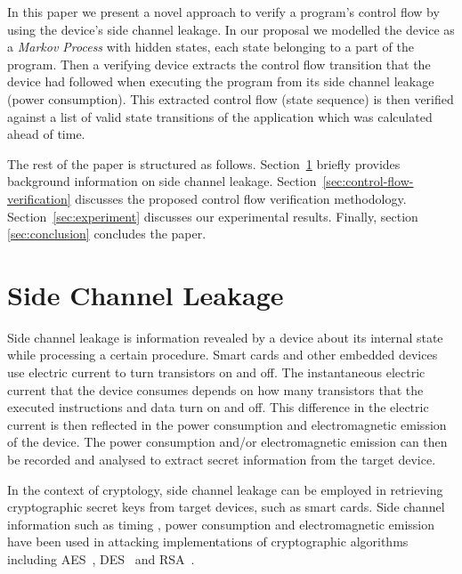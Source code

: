 \documentclass[lnicst]{svmultln}
\begin{document}
In this paper we present a novel approach to verify a program's control flow by using the device's side channel leakage. In our proposal we modelled the device as a \emph{Markov Process} with hidden states, each state belonging to a part of the program. Then a verifying device extracts the control flow transition that the device had followed when executing the program from its side channel leakage (power consumption). This extracted control flow (state sequence) is then verified against a list of valid state transitions of the application which was calculated ahead of time.

The rest of the paper is structured as follows. Section~\ref{sec:power-analysis} briefly provides background information on side channel leakage. Section~\ref{sec:control-flow-verification} discusses the proposed control flow verification methodology. Section~\ref{sec:experiment} discusses our experimental results. Finally, section \ref{sec:conclusion} concludes the paper.

\section{Side Channel Leakage}
\label{sec:power-analysis}

Side channel leakage is information revealed by a device about its internal state while processing a certain procedure. Smart cards and other embedded devices use electric current to turn transistors on and off. The instantaneous electric current that the device consumes depends on how many transistors that the executed instructions and data turn on and off. This difference in the electric current is then reflected in the power consumption and electromagnetic emission of the device. The power consumption and/or electromagnetic emission can then be recorded and analysed to extract secret information from the target device.

In the context of cryptology, side channel leakage can be employed in retrieving cryptographic secret keys from target devices, such as smart cards. Side channel information such as timing \cite{CRYPTO-96-P,CARDIS-98-DKLMQ,CT-RSA-13-CP}, power consumption \cite{CRYPTO-99-PJB,IDaTC-07-TSE,CHES-11-DC} and electromagnetic emission \cite{CT-RSA-12-JSBFG,CIS-11-KLXX,CS-85-WN} have been used in attacking implementations of cryptographic algorithms including AES~\cite{AES-02-JV}, DES~\cite{DES-98-W} and RSA~\cite{ACM-78-RSA}.
\end{document}
